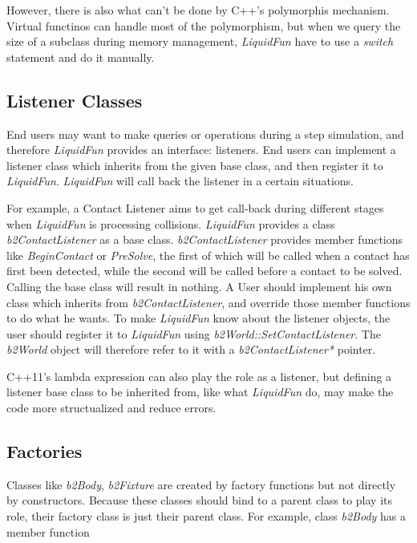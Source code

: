 \documentclass[UTF8]{ctexart}
\begin{document}
            However, there is also what can't be done by C++'s polymorphis mechanism. Virtual functinos can handle most of the polymorphism, but when we query the size of a subclass during memory management, \textit{LiquidFun} have to use a \textit{switch} statement and do it manually.

        \subsection{Listener Classes}

            End users may want to make queries or operations during a step simulation, and therefore \textit{LiquidFun} provides an interface: listeners. End users can implement a listener class which inherits from the given base class, and then register it to \textit{LiquidFun}. \textit{LiquidFun} will call back the listener in a certain situations.

            For example, a Contact Listener aims to get call-back during different stages when \textit{LiquidFun} is processing collisions. \textit{LiquidFun} provides a class \textit{b2ContactListener} as a base class. \textit{b2ContactListener} provides member functions like \textit{BeginContact} or \textit{PreSolve}, the first of which will be called when a contact has first been detected, while the second will be called before a contact to be solved. Calling the base class will result in nothing. A User should implement his own class which inherits from \textit{b2ContactListener}, and override those member functions to do what he wants. To make \textit{LiquidFun} know about the listener objects, the user should register it to \textit{LiquidFun} using \textit{b2World::SetContactListener}. The \textit{b2World} object will therefore refer to it with a \textit{b2ContactListener*} pointer.

            C++11's lambda expression can also play the role as a listener, but defining a listener base class to be inherited from, like what \textit{LiquidFun} do, may make the code more structualized and reduce errors.

        \subsection{Factories}

            Classes like \textit{b2Body}, \textit{b2Fixture} are created by factory functions but not directly by constructors. Because these classes should bind to a parent class to play its role, their factory class is just their parent class. For example, class \textit{b2Body} has a member function
            
\end{document}
